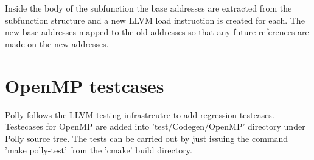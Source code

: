 Inside the body of the subfunction the base addresses are extracted from the subfunction structure and a new LLVM load instruction is created for each. The
new base addresses mapped to the old addresses so that any future references are made on the new addresses.

\section{OpenMP testcases}

Polly follows the LLVM testing infrastrcutre\cite{llvmtest} to add regression testcases. Testecases for OpenMP are added into
'test/Codegen/OpenMP' directory under Polly source tree. The tests can be carried out by just issuing the command 'make polly-test'
from the 'cmake' build directory.
